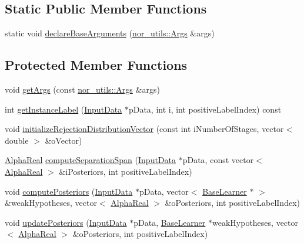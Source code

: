 \subsection*{Static Public Member Functions}
\begin{DoxyCompactItemize}
\item 
static void \hyperlink{classMultiBoost_1_1SoftCascadeLearner_a716efe648870f74e7051b4d1b4dd835b}{declare\-Base\-Arguments} (\hyperlink{classnor__utils_1_1Args}{nor\-\_\-utils\-::\-Args} \&args)
\end{DoxyCompactItemize}
\subsection*{Protected Member Functions}
\begin{DoxyCompactItemize}
\item 
void \hyperlink{classMultiBoost_1_1SoftCascadeLearner_aaebcba9c190f43531f676be41097c316}{get\-Args} (const \hyperlink{classnor__utils_1_1Args}{nor\-\_\-utils\-::\-Args} \&args)
\item 
int \hyperlink{classMultiBoost_1_1SoftCascadeLearner_ad7023d8f1a4642df400bbd7f9cf2c360}{get\-Instance\-Label} (\hyperlink{classMultiBoost_1_1InputData}{Input\-Data} $\ast$p\-Data, int i, int positive\-Label\-Index) const 
\item 
void \hyperlink{classMultiBoost_1_1SoftCascadeLearner_a119f02487b1d248263c5ce244aa78bc7}{initialize\-Rejection\-Distribution\-Vector} (const int i\-Number\-Of\-Stages, vector$<$ double $>$ \&o\-Vector)
\item 
\hyperlink{Defaults_8h_a80184c4fd10ab70a1a17c5f97dcd1563}{Alpha\-Real} \hyperlink{classMultiBoost_1_1SoftCascadeLearner_a753c5089ce5844e409495de229ee27dd}{compute\-Separation\-Span} (\hyperlink{classMultiBoost_1_1InputData}{Input\-Data} $\ast$p\-Data, const vector$<$ \hyperlink{Defaults_8h_a80184c4fd10ab70a1a17c5f97dcd1563}{Alpha\-Real} $>$ \&i\-Posteriors, int positive\-Label\-Index)
\item 
void \hyperlink{classMultiBoost_1_1SoftCascadeLearner_abf4016bdc2072383eba8d58d7996f9ba}{compute\-Posteriors} (\hyperlink{classMultiBoost_1_1InputData}{Input\-Data} $\ast$p\-Data, vector$<$ \hyperlink{classMultiBoost_1_1BaseLearner}{Base\-Learner} $\ast$ $>$ \&weak\-Hypotheses, vector$<$ \hyperlink{Defaults_8h_a80184c4fd10ab70a1a17c5f97dcd1563}{Alpha\-Real} $>$ \&o\-Posteriors, int positive\-Label\-Index)
\item 
void \hyperlink{classMultiBoost_1_1SoftCascadeLearner_abf5aa83444193d31de96613180fcb0dc}{update\-Posteriors} (\hyperlink{classMultiBoost_1_1InputData}{Input\-Data} $\ast$p\-Data, \hyperlink{classMultiBoost_1_1BaseLearner}{Base\-Learner} $\ast$weak\-Hypotheses, vector$<$ \hyperlink{Defaults_8h_a80184c4fd10ab70a1a17c5f97dcd1563}{Alpha\-Real} $>$ \&o\-Posteriors, int positive\-Label\-Index)

\end{DoxyCompactItemize}
